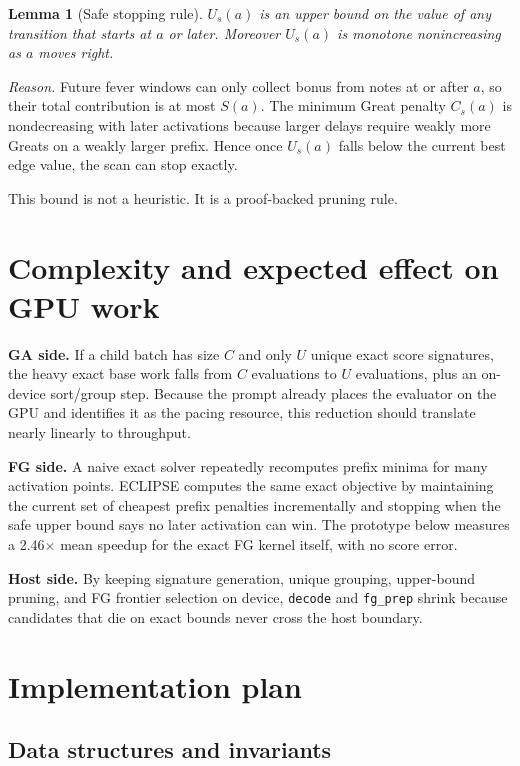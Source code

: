 \documentclass[11pt]{article}
\newtheorem{lemma}{Lemma}
\newcommand{\method}{ECLIPSE}
\begin{document}
\begin{lemma}[Safe stopping rule]
$U_s(a)$ is an upper bound on the value of \emph{any} transition that starts at $a$ or later. Moreover $U_s(a)$ is monotone nonincreasing as $a$ moves right.
\end{lemma}

\emph{Reason.} Future fever windows can only collect bonus from notes at or after $a$, so their total contribution is at most $S(a)$. The minimum Great penalty $C_s(a)$ is nondecreasing with later activations because larger delays require weakly more Greats on a weakly larger prefix. Hence once $U_s(a)$ falls below the current best edge value, the scan can stop exactly.

This bound is not a heuristic. It is a proof-backed pruning rule.

\section{Complexity and expected effect on GPU work}

\textbf{GA side.} If a child batch has size $C$ and only $U$ unique exact score signatures, the heavy exact base work falls from $C$ evaluations to $U$ evaluations, plus an on-device sort/group step. Because the prompt already places the evaluator on the GPU and identifies it as the pacing resource, this reduction should translate nearly linearly to throughput.

\textbf{FG side.} A naive exact solver repeatedly recomputes prefix minima for many activation points. \method{} computes the same exact objective by maintaining the current set of cheapest prefix penalties incrementally and stopping when the safe upper bound says no later activation can win. The prototype below measures a 2.46$\times$ mean speedup for the exact FG kernel itself, with no score error.

\textbf{Host side.} By keeping signature generation, unique grouping, upper-bound pruning, and FG frontier selection on device, \texttt{decode} and \texttt{fg\_prep} shrink because candidates that die on exact bounds never cross the host boundary.

\section{Implementation plan}

\subsection{Data structures and invariants}
\end{document}
